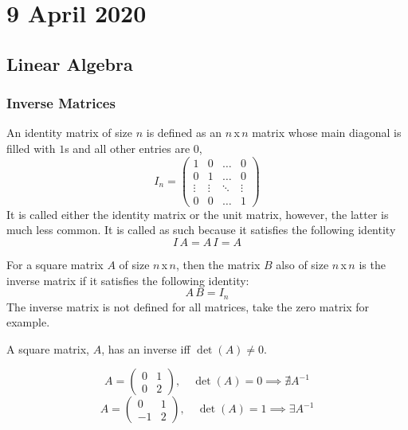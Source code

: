 \documentclass[diffeq.tex]{subfiles}
\begin{document}
\chapter{9 April 2020}
    \section{Linear Algebra}
    \subsection{Inverse Matrices}
    \begin{definition}
        An identity matrix of size $n$ is defined as an $n$\,x\,$n$ matrix whose main diagonal is filled with $1$s and all other entries are $0$,
        \begin{equation}
            I_{n} = \begin{pmatrix}
                1 & 0 & \dots & 0\\
                0 & 1 & \dots & 0\\
                \vdots & \vdots & \ddots & \vdots \\
                0 & 0 & \dots & 1 
            \end{pmatrix}
        \end{equation}
        It is called either the identity matrix or the unit matrix, however, the latter is much less common. It is called as such because it satisfies the following identity
        \begin{equation}
            I\,A = A\,I = A
        \end{equation}
    \end{definition}
    \begin{definition}
        For a square matrix $A$ of size $n$\,x\,$n$, then the matrix $B$ also of size $n$\,x\,$n$ is the inverse matrix if it satisfies the following identity:
        \begin{equation}
            A\,B = I_{n}
        \end{equation}
        The inverse matrix is not defined for all matrices, take the zero matrix for example.
    \end{definition}
    \begin{theorem}
        A square matrix, $A$, has an inverse iff $\det(A) \neq 0$.
    \end{theorem}
    \begin{example}
        \begin{equation}
            A = \begin{pmatrix}
                0 & 1\\
                0 & 2
            \end{pmatrix},\quad \det(A) = 0 \implies \nexists A^{-1}
        \end{equation}
        \begin{equation}
            A = \begin{pmatrix}
                0 & 1\\
                -1 & 2
            \end{pmatrix},\quad \det(A) = 1 \implies \exists A^{-1}
        \end{equation}
    \end{example}
\end{document}
